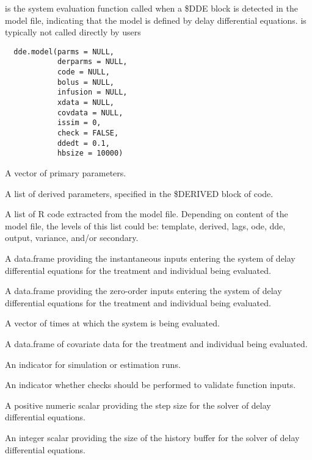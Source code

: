 %
\begin{Description}\relax
{} is the system evaluation function called when a \$DDE block is
detected in the model file, indicating that the model is defined by delay 
differential equations.  is typically not called directly by 
users
\end{Description}
%
\begin{Usage}
\begin{verbatim}
  dde.model(parms = NULL,
            derparms = NULL,
            code = NULL,
            bolus = NULL,
            infusion = NULL,
            xdata = NULL,
            covdata = NULL,
            issim = 0,
            check = FALSE,
            ddedt = 0.1,
            hbsize = 10000)
\end{verbatim}
\end{Usage}
%
\begin{Arguments}
\begin{ldescription}
\item[\code{parms}] A vector of primary parameters.
\item[\code{derparms}] A list of derived parameters, specified in the \$DERIVED block
of code.
\item[\code{code}] A list of R code extracted from the model file. Depending on 
content of the model file, the levels of this list could be: template,
derived, lags, ode, dde, output, variance, and/or secondary.
\item[\code{bolus}] A data.frame providing the instantaneous inputs  entering the 
system of delay differential equations for the treatment and individual 
being evaluated.
\item[\code{infusion}] A data.frame providing the zero-order inputs entering the 
system of delay differential equations for the treatment and individual 
being evaluated.
\item[\code{xdata}] A vector of times at which the system is being evaluated.
\item[\code{covdata}] A data.frame of covariate data for the treatment and individual 
being evaluated.
\item[\code{issim}] An indicator for simulation or estimation runs.
\item[\code{check}] An indicator whether checks should be performed to validate 
function inputs.
\item[\code{ddedt}] A positive numeric scalar providing the step size for the solver 
of delay differential equations.
\item[\code{hbsize}] An integer scalar providing the size of the history buffer for
the solver of delay differential equations.
\end{ldescription}
\end{Arguments}
